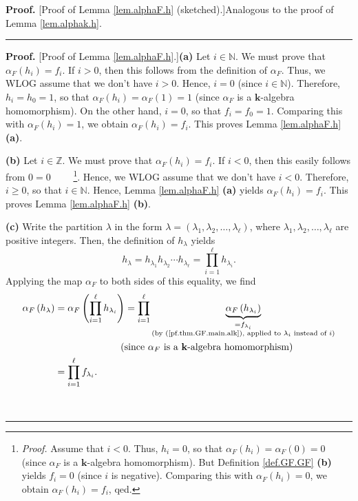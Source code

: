 \documentclass[numbers=enddot,12pt,final,onecolumn,notitlepage]{scrartcl}%
\theoremstyle{definition}
\newenvironment{proof}[1][Proof]{\noindent\textbf{#1.} }{\ \rule{0.5em}{0.5em}}
\let\prodnonlimits\prod
\renewcommand{\prod}{\prodnonlimits\limits}
\newenvironment{verlong}{}{}
\newenvironment{vershort}{}{}
\begin{document}
\begin{vershort}
\begin{proof}
[Proof of Lemma \ref{lem.alphaF.h} (sketched).]Analogous to the proof of Lemma
\ref{lem.alphak.h}.
\end{proof}
\end{vershort}

\begin{verlong}
\begin{proof}
[Proof of Lemma \ref{lem.alphaF.h}.]\textbf{(a)} Let $i\in\mathbb{N}$. We must
prove that $\alpha_{F}\left(  h_{i}\right)  =f_{i}$. If $i>0$, then this
follows from the definition of $\alpha_{F}$. Thus, we WLOG assume that we
don't have $i>0$. Hence, $i=0$ (since $i\in\mathbb{N}$). Therefore,
$h_{i}=h_{0}=1$, so that $\alpha_{F}\left(  h_{i}\right)  =\alpha_{F}\left(
1\right)  =1$ (since $\alpha_{F}$ is a $\mathbf{k}$-algebra homomorphism). On
the other hand, $i=0$, so that $f_{i}=f_{0}=1$. Comparing this with
$\alpha_{F}\left(  h_{i}\right)  =1$, we obtain $\alpha_{F}\left(
h_{i}\right)  =f_{i}$. This proves Lemma \ref{lem.alphaF.h} \textbf{(a)}.

\textbf{(b)} Let $i\in\mathbb{Z}$. We must prove that $\alpha_{F}\left(
h_{i}\right)  =f_{i}$. If $i<0$, then this easily follows from $0=0$%
\ \ \ \ \footnote{\textit{Proof.} Assume that $i<0$. Thus, $h_{i}=0$, so that
$\alpha_{F}\left(  h_{i}\right)  =\alpha_{F}\left(  0\right)  =0$ (since
$\alpha_{F}$ is a $\mathbf{k}$-algebra homomorphism). But Definition
\ref{def.GF.GF} \textbf{(b)} yields $f_{i}=0$ (since $i$ is negative).
Comparing this with $\alpha_{F}\left(  h_{i}\right)  =0$, we obtain
$\alpha_{F}\left(  h_{i}\right)  =f_{i}$, qed.}. Hence, we WLOG assume that we
don't have $i<0$. Therefore, $i\geq0$, so that $i\in\mathbb{N}$. Hence, Lemma
\ref{lem.alphaF.h} \textbf{(a)} yields $\alpha_{F}\left(  h_{i}\right)
=f_{i}$. This proves Lemma \ref{lem.alphaF.h} \textbf{(b)}.

\textbf{(c)} Write the partition $\lambda$ in the form $\lambda=\left(
\lambda_{1},\lambda_{2},\ldots,\lambda_{\ell}\right)  $, where $\lambda
_{1},\lambda_{2},\ldots,\lambda_{\ell}$ are positive integers. Then, the
definition of $h_{\lambda}$ yields
\[
h_{\lambda}=h_{\lambda_{1}}h_{\lambda_{2}}\cdots h_{\lambda_{\ell}}%
=\prod_{i=1}^{\ell}h_{\lambda_{i}}.
\]
Applying the map $\alpha_{F}$ to both sides of this equality, we find%
\begin{align}
\alpha_{F}\left(  h_{\lambda}\right)   &  =\alpha_{F}\left(  \prod_{i=1}%
^{\ell}h_{\lambda_{i}}\right)  =\prod_{i=1}^{\ell}\underbrace{\alpha
_{F}\left(  h_{\lambda_{i}}\right)  }_{\substack{=f_{\lambda_{i}}\\\text{(by
(\ref{pf.thm.GF.main.alk}), applied to }\lambda_{i}\text{ instead of
}i\text{)}}}\nonumber\\
&  \ \ \ \ \ \ \ \ \ \ \ \ \ \ \ \ \ \ \ \ \left(  \text{since }\alpha
_{F}\text{ is a }\mathbf{k}\text{-algebra homomorphism}\right) \nonumber\\
&  =\prod_{i=1}^{\ell}f_{\lambda_{i}}. \label{pf.lem.alphaF.h.c.2}%
\end{align}



\end{proof}
\end{verlong}
\end{document}
